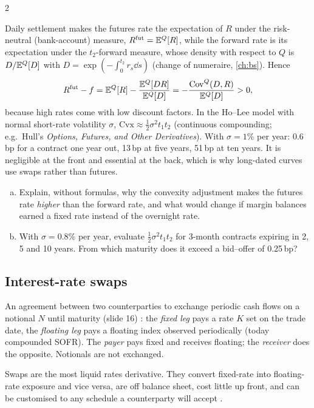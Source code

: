 \begin{paracol}{2}
\begin{remark}
Daily settlement makes the futures rate the expectation of $R$ under the risk-neutral (bank-account) measure,
$R^{\mathrm{fut}}=\mathbb{E}^{Q}[R]$, while the forward rate is its expectation under the $t_2$-forward measure, whose
density with respect to $Q$ is $D/\mathbb{E}^Q[D]$ with $D=\exp(-\int_0^{t_2}r_s\dd s)$ (change of numeraire,
\cref{ch:bs}). Hence
\[
  R^{\mathrm{fut}}-f=\mathbb{E}^Q[R]-\frac{\mathbb{E}^Q[DR]}{\mathbb{E}^Q[D]}=-\frac{\operatorname{Cov}^Q(D,R)}{\mathbb{E}^Q[D]}>0,
\]
because high rates come with low discount factors. In the Ho--Lee model with normal short-rate volatility
$\sigma$, $\mathrm{Cvx}\approx\tfrac12\sigma^2t_1t_2$ (continuous compounding; e.g.\ Hull's
\emph{Options, Futures, and Other Derivatives}). With $\sigma=1\%$ per year: 0.6\,bp for a contract one year
out, 13\,bp at five years, 51\,bp at ten years. It is negligible at the front and essential at the back, which
is why long-dated curves use swaps rather than futures.
\end{remark}

\begin{exercise}
\leavevmode
\begin{enumerate}[(a)]
  \item Explain, without formulas, why the convexity adjustment makes
      the futures rate \emph{higher} than the forward rate, and what
      would change if margin balances earned a fixed rate instead of the
      overnight rate.
  \item With $\sigma=0.8\%$ per year, evaluate
      $\frac12\sigma^2t_1t_2$ for 3-month contracts expiring in 2, 5 and
      10 years. From which maturity does it exceed a bid--offer of
      0.25\,bp?
\end{enumerate}
\end{exercise}
\par\medskip

\subsection{Interest-rate swaps}
\begin{definition}
An agreement between two counterparties to exchange periodic cash flows on a notional $N$ until maturity
(slide 16) : the \emph{fixed leg} pays a rate $K$ set on the trade date, the \emph{floating leg}
pays a floating index observed periodically (today compounded SOFR). The \emph{payer} pays fixed and receives
floating; the \emph{receiver} does the opposite. Notionals are not exchanged.
\end{definition}
Swaps are the most liquid rates derivative. They convert fixed-rate into floating-rate exposure and vice
versa, are off balance sheet, cost little up front, and can be customised to any schedule a counterparty will
accept .


\end{paracol}
